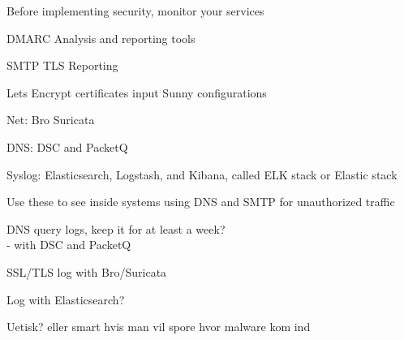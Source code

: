 \documentclass[Screen16to9,17pt]{foils}
\begin{document}
\begin{list2}
\item Before implementing security, monitor your services
\item DMARC Analysis and reporting tools
\item SMTP TLS Reporting
\end{list2}



Lets Encrypt certificates
input Sunny configurations



\begin{list2}
\item Net: Bro  Suricata 
\item DNS: DSC and PacketQ 
\item Syslog: Elasticsearch, Logstash, and Kibana, called ELK stack or Elastic stack
\item Use these to see inside systems using DNS and SMTP for unauthorized traffic
\end{list2}




\begin{list2}
\item DNS query logs, keep it for at least a week?\\
- with DSC and PacketQ 
\item SSL/TLS log with Bro/Suricata\\
{\footnotesize{}}
\item Log with Elasticsearch?\\
{\footnotesize{}}
\end{list2}

\centerline{Uetisk? eller smart hvis man vil spore hvor malware kom ind}
\end{document}
